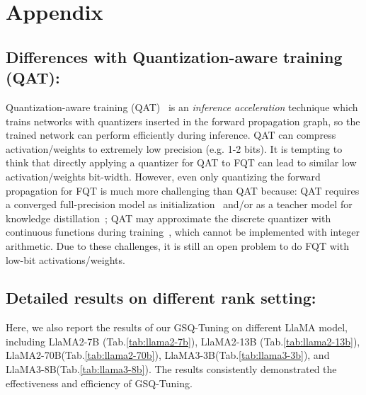 \appendix

\section{Appendix}
\label{sec:appendix}
\subsection{Differences with Quantization-aware training (QAT): }
\label{qat_fqt}
Quantization-aware training (QAT)~\cite{choi2018pact,Zhang_2018_ECCV,zhou2017incremental,jacob2018quantization,dong2019hawq,dong2019hawqv2,shen2019q,zafrir2019q8bert,shen2020QBERT,tang2022mkq,zhang2020ternarybert,bai2020binarybert,foret2020sharpness,wang2022squat} is an \emph{inference acceleration} technique which trains networks with quantizers inserted in the forward propagation graph, so the trained network can perform efficiently during inference. 
QAT can compress activation/weights to extremely low precision (e.g. 1-2 bits). 
It is tempting to think that directly applying a quantizer for QAT to FQT can lead to similar low activation/weights bit-width. However, even only quantizing the forward propagation for FQT is much more challenging than QAT because:  \raisebox{-0.5pt}{\ding[1.1]{182\relax}} QAT requires a converged full-precision model as initialization~\cite{esser2019learned} and/or as a teacher model for knowledge distillation~\cite{bai2020binarybert}; \raisebox{-0.5pt}{\ding[1.1]{184\relax}} QAT may approximate the discrete quantizer with continuous functions during training~\cite{gong2019differentiable}, which cannot be implemented with integer arithmetic. Due to these challenges, it is still an open problem to do FQT with low-bit activations/weights. 






\subsection{Detailed results on different rank setting:}
\label{sec:detailed_results}
Here, we also report the results of our GSQ-Tuning on different LlaMA model, including LlaMA2-7B (Tab.\ref{tab:llama2-7b}), LlaMA2-13B (Tab.\ref{tab:llama2-13b}), LlaMA2-70B(Tab.\ref{tab:llama2-70b}), LlaMA3-3B(Tab.\ref{tab:llama3-3b}), and LlaMA3-8B(Tab.\ref{tab:llama3-8b}). The results consistently demonstrated the effectiveness and efficiency of GSQ-Tuning.


